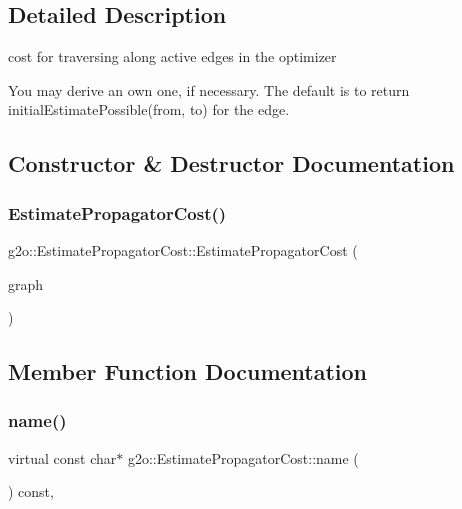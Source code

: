 \subsection{Detailed Description}
cost for traversing along active edges in the optimizer 

You may derive an own one, if necessary. The default is to return initial\+Estimate\+Possible(from, to) for the edge. 

\subsection{Constructor \& Destructor Documentation}
\mbox{\label{classg2o_1_1_estimate_propagator_cost_aebd56e3597a99b225bc3799ec8145bc9}} 
\subsubsection{\texorpdfstring{Estimate\+Propagator\+Cost()}{EstimatePropagatorCost()}}
{\footnotesize\ttfamily g2o\+::\+Estimate\+Propagator\+Cost\+::\+Estimate\+Propagator\+Cost (\begin{DoxyParamCaption}\item[{\mbox{\hyperlink{classg2o_1_1_sparse_optimizer}{Sparse\+Optimizer}} $\ast$}]{graph }\end{DoxyParamCaption})}



\subsection{Member Function Documentation}
\mbox{\label{classg2o_1_1_estimate_propagator_cost_a49846dd23f5d49df6e1fc5c2ff854fca}} 
\subsubsection{\texorpdfstring{name()}{name()}}
{\footnotesize\ttfamily virtual const char$\ast$ g2o\+::\+Estimate\+Propagator\+Cost\+::name (\begin{DoxyParamCaption}{ }\end{DoxyParamCaption}) const\hspace{0.3cm}{\ttfamily [inline]}, {\ttfamily [virtual]}}



